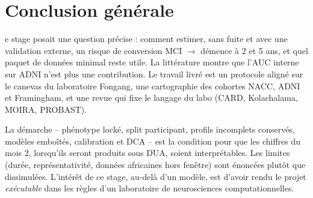 \chapter*{Conclusion générale}
\label{chap:conclusion}

e stage posait une question précise : comment estimer, sans fuite et avec une validation externe, un risque de conversion MCI $\rightarrow$ démence à 2 et 5 ans, et quel paquet de données minimal reste utile. La littérature montre que l'AUC interne sur ADNI n'est plus une contribution. Le travail livré est un protocole aligné sur le canevas du laboratoire Fongang, une cartographie des cohortes NACC, ADNI et Framingham, et une revue qui fixe le langage du labo (CARD, Kolachalama, MOIRA, PROBAST).

La démarche -- phénotype locké, split participant, profils incomplets conservés, modèles emboîtés, calibration et \ac{DCA} -- est la condition pour que les chiffres du mois 2, lorsqu'ils seront produits sous DUA, soient interprétables. Les limites (durée, représentativité, données africaines hors fenêtre) sont énoncées plutôt que dissimulées. L'intérêt de ce stage, au-delà d'un modèle, est d'avoir rendu le projet \emph{exécutable} dans les règles d'un laboratoire de neurosciences computationnelles.
